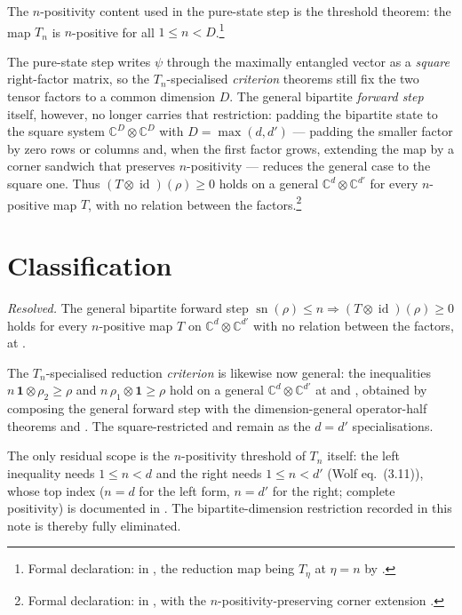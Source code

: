 \documentclass{article}
\begin{document}
The $n$-positivity content used in the pure-state step is the threshold theorem:
the map $T_n$ is $n$-positive for all $1\le n<D$.\footnote{Formal declaration:
     in
    , the reduction map being
    $T_\eta$ at $\eta=n$ by .}

The pure-state step writes $\psi$ through the maximally entangled vector as a
\emph{square} right-factor matrix, so the $T_n$-specialised \emph{criterion} theorems
still fix the two tensor factors to a common dimension $D$. The general bipartite
\emph{forward step} itself, however, no longer carries that restriction: padding the
bipartite state to the square system $\mathbb{C}^D\otimes\mathbb{C}^D$ with
$D=\max(d,d')$ — padding the smaller factor by zero rows or columns and, when the
first factor grows, extending the map by a corner sandwich that preserves
$n$-positivity — reduces the general case to the square one. Thus
$(T\otimes\operatorname{id})(\rho)\ge 0$ holds on a general
$\mathbb{C}^d\otimes\mathbb{C}^{d'}$ for every $n$-positive map $T$, with no relation
between the factors.\footnote{Formal declaration:
     in
    , with the $n$-positivity-preserving
    corner extension .}

\section{Classification}

\emph{Resolved.} The general bipartite forward step
$\operatorname{sn}(\rho)\le n\Rightarrow(T\otimes\operatorname{id})(\rho)\ge 0$ holds
for every $n$-positive map $T$ on $\mathbb{C}^d\otimes\mathbb{C}^{d'}$ with no relation
between the factors, at
.

The $T_n$-specialised reduction \emph{criterion} is likewise now general: the
inequalities $n\,\mathbf 1\otimes\rho_2\ge\rho$ and $n\,\rho_1\otimes\mathbf 1\ge\rho$
hold on a general $\mathbb{C}^d\otimes\mathbb{C}^{d'}$ at
 and
, obtained by
composing the general forward step with the dimension-general operator-half theorems
 and .
The square-restricted  and
 remain as the $d=d'$
specialisations.

The only residual scope is the $n$-positivity threshold of $T_n$ itself: the left
inequality needs $1\le n<d$ and the right needs $1\le n<d'$ (Wolf eq.~(3.11)), whose
top index ($n=d$ for the left form, $n=d'$ for the right; complete positivity) is
documented in . The bipartite-dimension
restriction recorded in this note is thereby fully eliminated.



\end{document}
